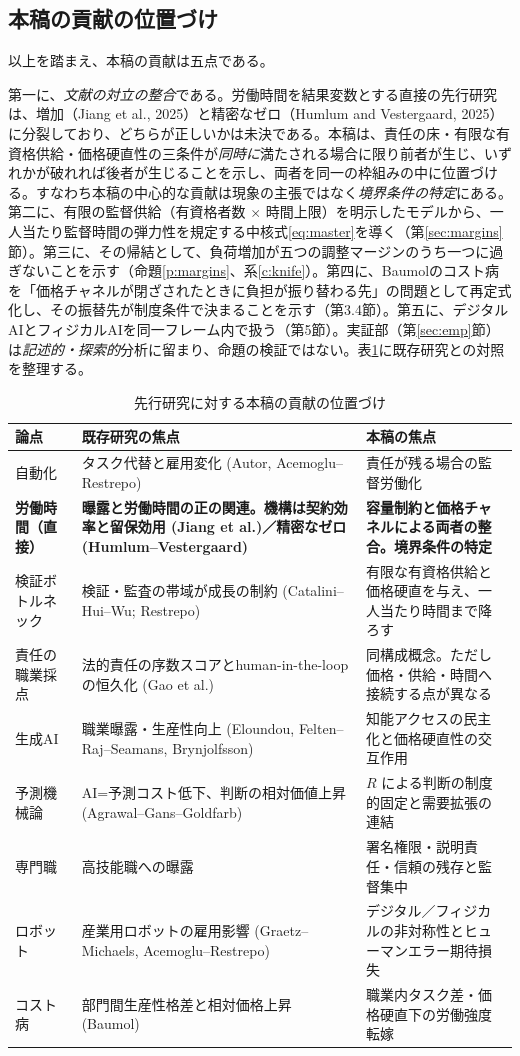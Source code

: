 \documentclass[11pt]{article}
\theoremstyle{plain}
\theoremstyle{definition}
\theoremstyle{remark}
\begin{document}
\subsection{本稿の貢献の位置づけ}
以上を踏まえ、本稿の貢献は五点である。

第一に、\emph{文献の対立の整合}である。労働時間を結果変数とする直接の先行研究は、増加（Jiang et al., 2025）と精密なゼロ（Humlum and Vestergaard, 2025）に分裂しており、どちらが正しいかは未決である。本稿は、責任の床・有限な有資格供給・価格硬直性の三条件が\emph{同時に}満たされる場合に限り前者が生じ、いずれかが破れれば後者が生じることを示し、両者を同一の枠組みの中に位置づける。すなわち本稿の中心的な貢献は現象の主張ではなく\emph{境界条件の特定}にある。第二に、有限の監督供給（有資格者数 $\times$ 時間上限）を明示したモデルから、一人当たり監督時間の弾力性を規定する中核式\eqref{eq:master}を導く（第\ref{sec:margins}節）。第三に、その帰結として、負荷増加が五つの調整マージンのうち一つに過ぎないことを示す（命題\ref{p:margins}、系\ref{c:knife}）。第四に、Baumolのコスト病を「価格チャネルが閉ざされたときに負担が振り替わる先」の問題として再定式化し、その振替先が制度条件で決まることを示す（第3.4節）。第五に、デジタルAIとフィジカルAIを同一フレーム内で扱う（第5節）。実証部（第\ref{sec:emp}節）は\emph{記述的・探索的}分析に留まり、命題の検証ではない。表\ref{tab:contrib}に既存研究との対照を整理する。

\begin{table}[t]\centering\small
\caption{先行研究に対する本稿の貢献の位置づけ}\label{tab:contrib}
\begin{tabularx}{\textwidth}{@{}lXX@{}}
\toprule
論点 & 既存研究の焦点 & 本稿の焦点 \\ \midrule
自動化 & タスク代替と雇用変化 (Autor, Acemoglu--Restrepo) & 責任が残る場合の監督労働化 \\
\textbf{労働時間（直接）} & \textbf{曝露と労働時間の正の関連。機構は契約効率と留保効用 (Jiang et al.)／精密なゼロ (Humlum--Vestergaard)} & \textbf{容量制約と価格チャネルによる両者の整合。境界条件の特定} \\
検証ボトルネック & 検証・監査の帯域が成長の制約 (Catalini--Hui--Wu; Restrepo) & 有限な有資格供給と価格硬直を与え、一人当たり時間まで降ろす \\
責任の職業採点 & 法的責任の序数スコアとhuman-in-the-loop の恒久化 (Gao et al.) & 同構成概念。ただし価格・供給・時間へ接続する点が異なる \\
生成AI & 職業曝露・生産性向上 (Eloundou, Felten--Raj--Seamans, Brynjolfsson) & 知能アクセスの民主化と価格硬直性の交互作用 \\
予測機械論 & AI=予測コスト低下、判断の相対価値上昇 (Agrawal--Gans--Goldfarb) & $R$ による判断の制度的固定と需要拡張の連結 \\
専門職 & 高技能職への曝露 & 署名権限・説明責任・信頼の残存と監督集中 \\
ロボット & 産業用ロボットの雇用影響 (Graetz--Michaels, Acemoglu--Restrepo) & デジタル／フィジカルの非対称性とヒューマンエラー期待損失 \\
コスト病 & 部門間生産性格差と相対価格上昇 (Baumol) & 職業内タスク差・価格硬直下の労働強度転嫁 \\
\bottomrule
\end{tabularx}
\end{table}
\end{document}
